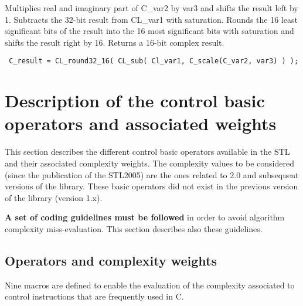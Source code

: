 Multiplies real and imaginary part of C\_var2 by var3 and shifts the result left by 1.
Subtracts the 32-bit result from CL\_var1 with saturation. Rounds the 16 least significant bits of the result into the 16 most significant bits with saturation and shifts the result right by 16.
Returns a 16-bit complex result.

{\tt {} C\_result = CL\_round32\_16( CL\_sub( Cl\_var1, C\_scale(C\_var2, var3) ) ); }


\section{Description of the control basic operators and associated weights}

This section describes the different control basic operators
available in the STL and their associated complexity weights. The
complexity values to be considered (since the publication of the
STL2005) are the ones related to 2.0 and subsequent versions of the library.
These basic operators did not exist in the previous version of the
library (version 1.x).

\textbf{A set of coding guidelines must be followed} in order to
avoid algorithm complexity miss-evaluation. This section describes
also these guidelines.

\subsection{Operators and complexity weights}
Nine macros are defined to enable the evaluation of the complexity
associated to control instructions that are frequently used in C.

